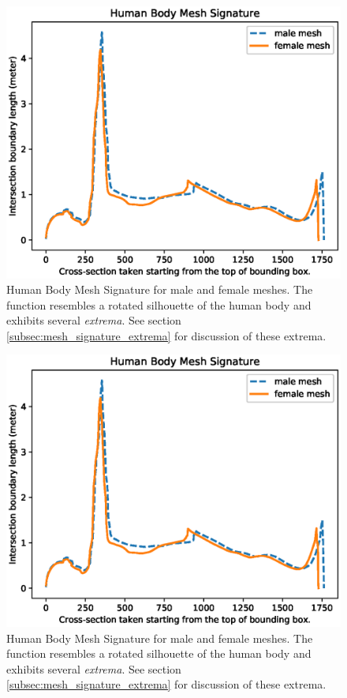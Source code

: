 \documentclass[runningheads, orivec]{llncs}
\begin{document}
\begin{figure}[H]
	\begin{center}
		\includegraphics[width=\linewidth]{Figure_1.eps}
	\end{center}
	\caption{Human Body Mesh Signature for male and female meshes. The 
		function resembles a rotated silhouette of the human body and exhibits 
		several \textit{extrema}. See section 
		\ref{subsec:mesh_signature_extrema} for discussion of these extrema.}
	\label{fig:qualitative_eval}
\end{figure}

\begin{figure}[H]
	\begin{center}
		\includegraphics[width=\linewidth]{Figure_1.eps}
	\end{center}
	\caption{Human Body Mesh Signature for male and female meshes. The 
		function resembles a rotated silhouette of the human body and exhibits 
		several \textit{extrema}. See section 
		\ref{subsec:mesh_signature_extrema} for discussion of these extrema.}
	\label{fig:qualitative_eval}
\end{figure}
\end{document}
